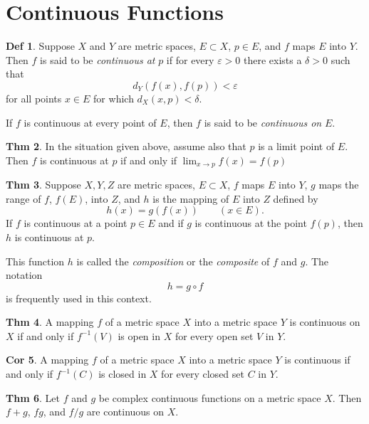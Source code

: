 \documentclass{article}
\theoremstyle{definition}
\newtheorem{definition}{Def}
\newtheorem{theorem}[definition]{Thm}
\newtheorem{corollary}[definition]{Cor}
\begin{document}
\section{Continuous Functions}
\begin{definition}
    Suppose $X$ and $Y$ are metric spaces, $E\subset X$, $p\in E$, and $f$ maps $E$ into $Y$. Then $f$ is said to be \textit{continuous at} $p$ if for every $\varepsilon>0$ there exists a $\delta>0$ such that
    \[
    d_Y(f(x), f(p))<\varepsilon
    \]
    for all points $x\in E$ for which $d_X(x,p)<\delta$.\par
    If $f$ is continuous at every point of $E$, then $f$ is said to be \textit{continuous on} $E$.
\end{definition}
\begin{theorem}
    In the situation given above, assume also that $p$ is a limit point of $E$. Then $f$ is continuous at $p$ if and only if $\lim_{x\to p}f(x)=f(p)$
\end{theorem}
\begin{theorem}
    Suppose $X, Y, Z$ are metric spaces, $E\subset X$, $f$ maps $E$ into $Y$, $g$ maps the range of $f$, $f(E)$, into $Z$, and $h$ is the mapping of $E$ into $Z$ defined by
    \[
    h(x)=g(f(x))\qquad (x\in E).
    \]
    If $f$ is continuous at a point $p\in E$ and if $g$ is continuous at the point $f(p)$, then $h$ is continuous at $p$.\par
    This function $h$ is called the \textit{composition} or the \textit{composite} of $f$ and $g$. The notation
    \[
    h=g\circ f
    \]
    is frequently used in this context.
\end{theorem}
\begin{theorem}
    A mapping $f$ of a metric space $X$ into a metric space $Y$ is continuous on $X$ if and only if $f^{-1}(V)$ is open in $X$ for every open set $V$ in $Y$.
\end{theorem}
\begin{corollary}
    A mapping $f$ of a metric space $X$ into a metric space $Y$ is continuous if and only if $f^{-1}(C)$ is closed in $X$ for every closed set $C$ in $Y$.
\end{corollary}
\begin{theorem}
    Let $f$ and $g$ be complex continuous functions on a metric space $X$. Then $f+g$, $fg$, and $f/g$ are continuous on $X$.
\end{theorem}
\end{document}
